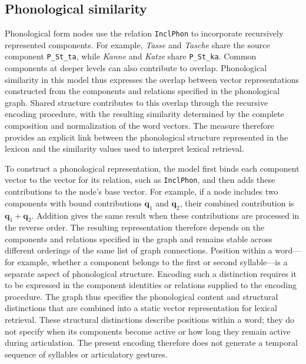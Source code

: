 \subsection{Phonological similarity}
Phonological form nodes use the relation \texttt{InclPhon} to incorporate recursively represented components. For example, \emph{Tasse} and \emph{Tasche} share the source component \texttt{P\_St\_ta}, while \emph{Kanne} and \emph{Katze} share \texttt{P\_St\_ka}. Common components at deeper levels can also contribute to overlap. Phonological similarity in this model thus expresses the overlap between vector representations constructed from the components and relations specified in the phonological graph. Shared structure contributes to this overlap through the recursive encoding procedure, with the resulting similarity determined by the complete composition and normalization of the word vectors. The measure therefore provides an explicit link between the phonological structure represented in the lexicon and the similarity values used to interpret lexical retrieval.

To construct a phonological representation, the model first binds each component vector to the vector for its relation, such as \texttt{InclPhon}, and then adds these contributions to the node's base vector. For example, if a node includes two components with bound contributions $\mathbf q_1$ and $\mathbf q_2$, their combined contribution is $\mathbf q_1+\mathbf q_2$. Addition gives the same result when these contributions are processed in the reverse order. The resulting representation therefore depends on the components and relations specified in the graph and remains stable across different orderings of the same list of graph connections. Position within a word---for example, whether a component belongs to the first or second syllable---is a separate aspect of phonological structure. Encoding such a distinction requires it to be expressed in the component identities or relations supplied to the encoding procedure. The graph thus specifies the phonological content and structural distinctions that are combined into a static vector representation for lexical retrieval. These structural distinctions describe positions within a word; they do not specify when its components become active or how long they remain active during articulation. The present encoding therefore does not generate a temporal sequence of syllables or articulatory gestures.

